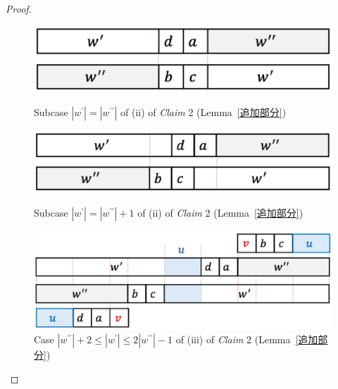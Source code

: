 \begin{proof}
\begin{figure}[t]
  \begin{center}
    \includegraphics[scale=0.45]{figs/w=w_1.eps}
    \caption{Subcase $|w^{\prime}| = |w^{\prime\prime}|$ of (ii) of \textit{Claim} 2 (Lemma~\ref{追加部分})}\label{追加部分7}
    \bigskip
    \includegraphics[scale=0.45]{figs/w=w_1+1.eps}
    \caption{Subcase $|w^{\prime}| = |w^{\prime\prime}| + 1$ of (ii) of \textit{Claim} 2 (Lemma~\ref{追加部分})}\label{追加部分8}
  \end{center}
\end{figure}

\begin{figure}[t]
  \begin{center}
    \includegraphics[scale=0.45]{figs/w1+3.eps}
    \caption{Case $|w^{\prime\prime}| + 2 \le |w^{\prime}| \le 2|w^{\prime\prime}| - 1$ of (iii) of \textit{Claim} 2 (Lemma~\ref{追加部分})}\label{w1+3}
  \end{center}
\end{figure}


\end{proof}
